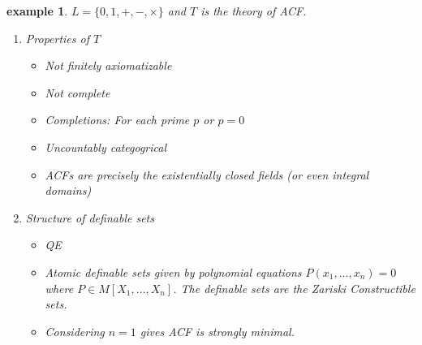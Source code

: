 \documentclass[letterpaper, 12pt]{article}
\newcommand{\fin}{\qquad \quad \hfill \framebox[1.75mm][l]{\,}}
\theoremstyle{stdthm}
\theoremstyle{stddef}
\newtheorem{eg}[thm]{example} %
\theoremstyle{stdnonum}
\theoremstyle{stdqands}
\theoremstyle{stdbold}
\begin{document}
\begin{eg}
$L = \{0,1,+,-,\times\}$ and $T$ is the theory of ACF. 
\begin{enumerate}
\item Properties of $T$
\begin{itemize}
\item Not finitely axiomatizable
\item Not complete
\item Completions: For each prime $p$ or $p=0$
\item Uncountably categogrical 
\item ACFs are precisely the existentially closed fields (or even integral domains)
\end{itemize}
\item Structure of definable sets
\begin{itemize}
\item QE
\item Atomic definable sets given by polynomial equations $P(x_1,\dots,x_n)=0$ where $P \in M[X_1,\dots, X_n]$. The definable sets are the Zariski Constructible sets.  
\item Considering $n=1$ gives ACF is strongly minimal. 
\end{itemize}
\end{enumerate}

\end{eg}
\end{document}

